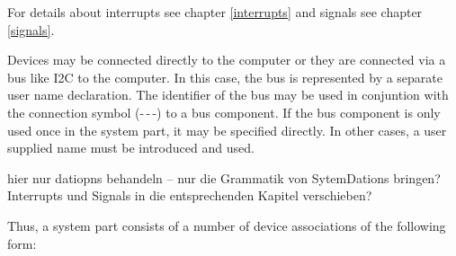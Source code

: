 

For details about interrupts see chapter \ref{interrupts} and 
signals see chapter \ref{signals}.


Devices may be connected directly to the computer or they are connected 
via a bus like I2C to the computer. In this case, the bus is represented
by a separate user name declaration. The identifier of the bus may
be used in conjuntion with the connection symbol (-\,-\,-) to
a bus component. If the bus component is only used once in the system part,
it may be specified directly. In other cases, a user supplied name
must be introduced and used.

\begin{discuss}
hier nur datiopns behandeln -- nur die Grammatik von SytemDations 
bringen? Interrupts und Signals in die entsprechenden Kapitel
 verschieben?
\end{discuss}

Thus, a system part consists of a number of device associations of the
following form:










 
